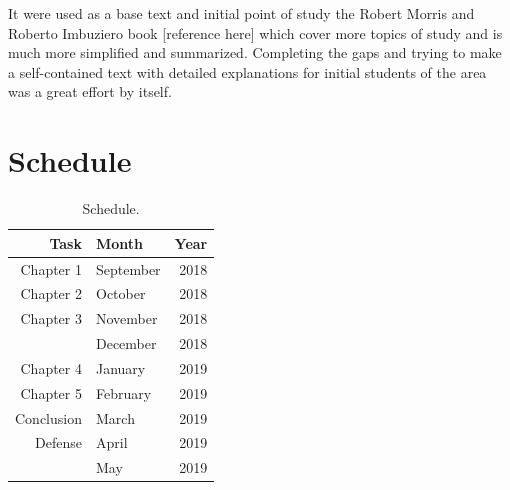 \documentclass[12pt,twoside,a4paper]{book}
\numberwithin{equation}{section}
\theoremstyle{remark}
\begin{document}
It were used as a base text and initial point of study the Robert Morris and Roberto Imbuziero book [reference here] which cover more topics of study and is much more simplified and summarized. Completing the gaps and trying to make a self-contained text with detailed explanations for initial students of the area was a great effort by itself.



\chapter{Schedule}

\begin{table}[h]
\centering

\begin{tabular}{|r|lr|}
\hline
Task & Month&Year \\ 
\hline                               
Chapter 1& September & 2018 \\
Chapter 2 &October & 2018 \\
Chapter 3&November & 2018 \\
 &December & 2018 \\
Chapter 4&January & 2019 \\
Chapter 5&February & 2019 \\
Conclusion&March & 2019 \\
Defense&April & 2019 \\
 &May & 2019   \\ 
\hline
\end{tabular}
\caption{Schedule.}
\label{tab:schedule}
\end{table}
\end{document}
